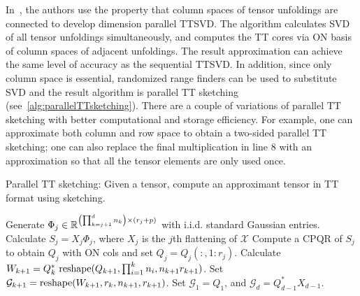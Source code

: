 \documentclass[11pt,a4paper,review]{siamart220329}
\begin{document}
In~\cite{shi2023parallel}, the authors use the property that column spaces of tensor unfoldings are connected to develop dimension parallel TTSVD. The algorithm calculates SVD of all tensor unfoldings simultaneously, and computes the TT cores via ON basis of column spaces of adjacent unfoldings. The result approximation can achieve the same level of accuracy as the sequential TTSVD. In addition, since only column space is essential, randomized range finders can be used to substitute SVD and the result algorithm is parallel TT sketching (see~\cref{alg:parallelTTsketching}). There are a couple of variations of parallel TT sketching with better computational and storage efficiency. For example, one can approximate both column and row space to obtain a two-sided parallel TT sketching; one can also replace the final multiplication in line 8 with an approximation so that all the tensor elements are only used once.

\begin{algorithm}
\caption{Parallel TT sketching: Given a tensor, compute an approximant tensor in TT format using sketching.}
\begin{algorithmic}[1]
\label{alg:parallelTTsketching}
\State Generate $\Phi_j \in \mathbb{R}^{\left(\prod_{k=j+1}^d n_k\right) \times (r_j+p)}$ with i.i.d. standard Gaussian entries.
\State Calculate $S_j = X_j\Phi_j$, where $X_j$ is the $j$th flattening of $\mathcal{X}$
\State Compute a CPQR of $S_j$ to obtain $Q_j$ with ON cols and set $Q_j = Q_j(:,\!1\!:\!r_j)$.
\EndFor
{}
\State Calculate $W_{k+1} = Q_k^* \ {\rm reshape}(Q_{k+1}, \prod_{i=1}^k n_i ,n_{k+1}r_{k+1})$.
\State Set $\mathcal{G}_{k+1} = {\rm reshape}(W_{k+1}, r_k, n_{k+1}, r_{k+1})$.
\EndFor
\State Set $\mathcal{G}_1 = Q_1$, and $\mathcal{G}_d = Q_{d-1}^*X_{d-1}$.
\end{algorithmic}
\end{algorithm}
\end{document}
